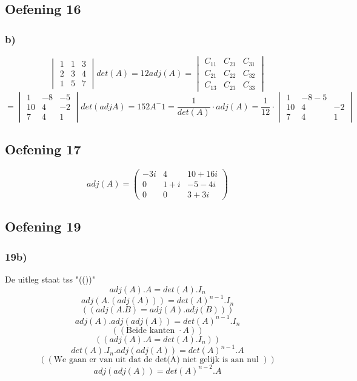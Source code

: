 \documentclass[lineaire_algebra_oplossingen.tex]{subfiles}
\begin{document}
\subsection{Oefening 16}
\subsubsection*{b)}
\[
\begin{vmatrix}
1 & 1 & 3\\
2 & 3 & 4\\
1 & 5 & 7
\end{vmatrix}
det(A) = 12
adj(A) =
\begin{vmatrix}
C_{11} & C_{21} & C_{31}\\
C_{21} & C_{22} & C_{32}\\
C_{13} & C_{23} & C_{33}
\end{vmatrix}
\]
\[
= 
\begin{vmatrix}
1 & -8 & -5\\
10 & 4 & -2\\
7 & 4 & 1
\end{vmatrix}
det(adj A) = 152
A^-1 = \frac{1}{det(A)} \cdot adj(A)
	 = \frac{1}{12} \cdot \begin{vmatrix}
	 						1 & -8	-5\\
	 						10 & 4 & -2\\
	 						7 & 4 & 1
	 					  \end{vmatrix}
\]


\subsection{Oefening 17}
\[
adj(A)=
\begin{pmatrix}
-3i & 4 & 10+16i\\
0 & 1+i & -5-4i\\
0 & 0 & 3+3i
\end{pmatrix}
\]

\subsection{Oefening 19}
\subsubsection*{19b)}
De uitleg staat tss "(())"
\[adj(A).A = det(A).I_{n}\]
\[adj(A.(adj(A))) = det(A)^{n-1}.I_{n}\]
\[((adj(A.B)=adj(A).adj(B)))\]
\[adj(A).adj(adj(A)) = det(A)^{n-1}.I_{n}\] 
\[(( \text{Beide kanten } \cdot A )) \]
\[(( adj(A).A = det(A).I_{n} )) \]
\[det(A).I_{n}.adj(adj(A)) = det(A)^{n-1}.A\]
\[((\text{We gaan er van uit dat de det(A) niet gelijk is aan nul }))\]
\[adj(adj(A)) = det(A)^{n-2}.A\]
\end{document}
